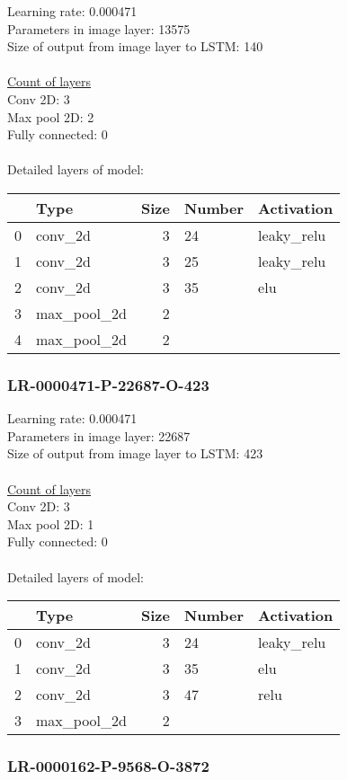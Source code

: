 Learning rate: 0.000471
\\Parameters in image layer: 13575
\\Size of output from image layer to LSTM: 140
\\\\\underline{Count of layers} 
\\Conv 2D:           3\\Max pool 2D:      2\\Fully connected:  0
\\\\Detailed layers of model: \\\begin{tabular}{rlrll}
\hline
    & Type        &   Size & Number   & Activation   \\
\hline
  0 & conv\_2d     &      3 & 24       & leaky\_relu   \\
  1 & conv\_2d     &      3 & 25       & leaky\_relu   \\
  2 & conv\_2d     &      3 & 35       & elu          \\
  3 & max\_pool\_2d &      2 &          &              \\
  4 & max\_pool\_2d &      2 &          &              \\
\hline
\end{tabular}\subsubsection*{LR-0000471-P-22687-O-423}
Learning rate: 0.000471
\\Parameters in image layer: 22687
\\Size of output from image layer to LSTM: 423
\\\\\underline{Count of layers} 
\\Conv 2D:           3\\Max pool 2D:      1\\Fully connected:  0
\\\\Detailed layers of model: \\\begin{tabular}{rlrll}
\hline
    & Type        &   Size & Number   & Activation   \\
\hline
  0 & conv\_2d     &      3 & 24       & leaky\_relu   \\
  1 & conv\_2d     &      3 & 35       & elu          \\
  2 & conv\_2d     &      3 & 47       & relu         \\
  3 & max\_pool\_2d &      2 &          &              \\
\hline
\end{tabular}\subsubsection*{LR-0000162-P-9568-O-3872}
